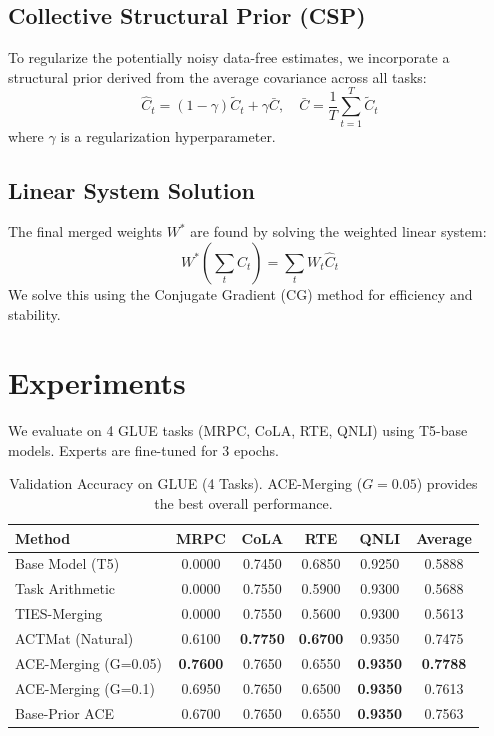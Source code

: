 \documentclass{article} %
\begin{document}
\subsection{Collective Structural Prior (CSP)}
To regularize the potentially noisy data-free estimates, we incorporate a structural prior derived from the average covariance across all tasks:
\begin{equation}
    \hat{C}_t = (1-\gamma) \tilde{C}_t + \gamma \bar{C}, \quad \bar{C} = \frac{1}{T} \sum_{t=1}^T \tilde{C}_t
\end{equation}
where $\gamma$ is a regularization hyperparameter.

\subsection{Linear System Solution}
The final merged weights $W^*$ are found by solving the weighted linear system:
\begin{equation}
    W^* \left( \sum_t \hat{C}_t \right) = \sum_t W_t \hat{C}_t
\end{equation}
We solve this using the Conjugate Gradient (CG) method for efficiency and stability.

\section{Experiments}
We evaluate on 4 GLUE tasks (MRPC, CoLA, RTE, QNLI) using T5-base models. Experts are fine-tuned for 3 epochs.

\begin{table}[h]
\caption{Validation Accuracy on GLUE (4 Tasks). ACE-Merging ($G=0.05$) provides the best overall performance.}
\label{results-table}
\begin{center}
\begin{tabular}{lccccc}
\toprule
\bf Method & \bf MRPC & \bf CoLA & \bf RTE & \bf QNLI & \bf Average \\
\midrule
Base Model (T5)      & 0.0000 & 0.7450 & 0.6850 & 0.9250 & 0.5888 \\
Task Arithmetic      & 0.0000 & 0.7550 & 0.5900 & 0.9300 & 0.5688 \\
TIES-Merging         & 0.0000 & 0.7550 & 0.5600 & 0.9300 & 0.5613 \\
\midrule
ACTMat (Natural)     & 0.6100 & \bf 0.7750 & \bf 0.6700 & 0.9350 & 0.7475 \\
ACE-Merging (G=0.05) & \bf 0.7600 & 0.7650 & 0.6550 & \bf 0.9350 & \bf 0.7788 \\
ACE-Merging (G=0.1)  & 0.6950 & 0.7650 & 0.6500 & \bf 0.9350 & 0.7613 \\
Base-Prior ACE       & 0.6700 & 0.7650 & 0.6550 & \bf 0.9350 & 0.7563 \\
\bottomrule
\end{tabular}
\end{center}
\end{table}
\end{document}
